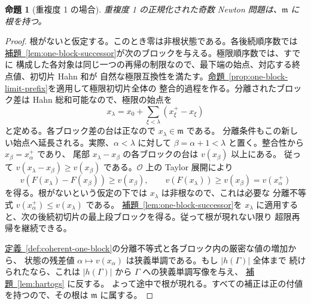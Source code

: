 \documentclass[11pt,uplatex,dvipdfmx]{jsarticle}
\newcommand{\Val}{v}
\newcommand{\Ocal}{\mathcal O}
\newcommand{\namedref}[2]{\hyperref[#2]{#1~\ref*{#2}}}
\theoremstyle{proofnote}
\newtheorem{proposition}[theorem]{命題}
\begin{document}
\begin{proposition}[重複度 1 の場合]
\label{prop:multiplicity-one-core}
  重複度 1 の正規化された奇数 Newton 問題は、\(\mathfrak m\) に根を持つ。
\end{proposition}
\begin{proof}
  根がないと仮定する。このとき零は非根状態である。各後続順序数では
  \namedref{補題}{lem:one-block-successor}が次のブロックを与える。極限順序数では、すでに
  構成した各対象は同じ一つの再帰の制限なので、最下端の始点、対応する終点値、初切片 Hahn 和が
  自然な極限互換性を満たす。\namedref{命題}{prop:one-block-limit-prefix}を適用して極限初切片全体の
  整合的過程を作る。分離されたブロック差は Hahn 総和可能なので、極限の始点を
  \[
    x_\lambda=x_0+\sum_{\xi<\lambda}(x_\xi^+-x_\xi)
  \]
  と定める。各ブロック差の台は正なので \(x_\lambda\in\mathfrak m\) である。
  分離条件もこの新しい始点へ延長される。実際、\(\alpha<\lambda\) に対して
  \(\beta=\alpha+1<\lambda\) と置く。整合性から \(x_\beta=x_\alpha^+\) であり、
  尾部 \(x_\lambda-x_\beta\) の各ブロックの台は \(v(x_\beta)\) 以上にある。
  従って \(\Val(x_\lambda-x_\beta)\ge v(x_\beta)\) である。\(\Ocal\) 上の
  Taylor 展開により
  \[
    \Val(F(x_\lambda)-F(x_\beta))\ge v(x_\beta),
    \qquad
    \Val(F(x_\lambda))\ge v(x_\beta)=v(x_\alpha^+)
  \]
  を得る。根がないという仮定の下では \(x_\lambda\) は非根なので、これは必要な
  分離不等式 \(v(x_\alpha^+)\le v(x_\lambda)\) である。
  \namedref{補題}{lem:one-block-successor}を
  \(x_\lambda\) に適用すると、次の後続初切片の最上段ブロックを得る。従って根が現れない限り
  超限再帰を継続できる。

  \namedref{定義}{def:coherent-one-block}の分離不等式と各ブロック内の厳密な値の増加から、
  状態の残差値 \(\alpha\mapsto v(x_\alpha)\) は狭義単調である。もし \(|h(\Gamma)|\) 全体まで
  続けられたなら、これは \(|h(\Gamma)|\) から \(\Gamma\) への狭義単調写像を与え、
  \namedref{補題}{lem:hartogs} に反する。
  よって途中で根が現れる。すべての補正は正の付値を持つので、その根は
  \(\mathfrak m\) に属する。
\end{proof}
\end{document}
